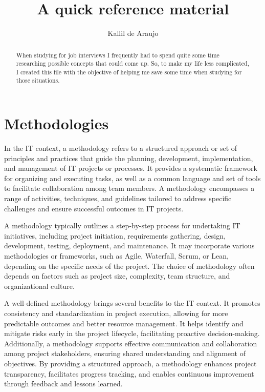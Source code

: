 \documentclass[]{report}
\title{A quick reference material}
\author{Kallil de Araujo}
\begin{document}
\maketitle

\begin{abstract}
	
	When studying for job interviews I frequently had to spend quite some time researching possible concepts that could come up. So, to make my life less complicated, I created this file with the objective of helping me save some time when studying for those situations.
	
\end{abstract}

\chapter{Methodologies}

In the IT context, a methodology refers to a structured approach or set of principles and practices that guide the planning, development, implementation, and management of IT projects or processes. It provides a systematic framework for organizing and executing tasks, as well as a common language and set of tools to facilitate collaboration among team members. A methodology encompasses a range of activities, techniques, and guidelines tailored to address specific challenges and ensure successful outcomes in IT projects.

A methodology typically outlines a step-by-step process for undertaking IT initiatives, including project initiation, requirements gathering, design, development, testing, deployment, and maintenance. It may incorporate various methodologies or frameworks, such as Agile, Waterfall, Scrum, or Lean, depending on the specific needs of the project. The choice of methodology often depends on factors such as project size, complexity, team structure, and organizational culture.

A well-defined methodology brings several benefits to the IT context. It promotes consistency and standardization in project execution, allowing for more predictable outcomes and better resource management. It helps identify and mitigate risks early in the project lifecycle, facilitating proactive decision-making. Additionally, a methodology supports effective communication and collaboration among project stakeholders, ensuring shared understanding and alignment of objectives. By providing a structured approach, a methodology enhances project transparency, facilitates progress tracking, and enables continuous improvement through feedback and lessons learned.
\end{document}

